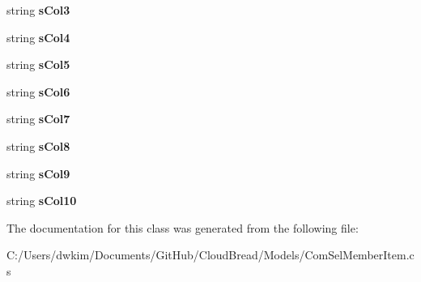 \begin{DoxyCompactItemize}
\item 
string {\bfseries s\+Col3}\hypertarget{a00064_ab3d514e486833de1826588673ecfb01e}{}\label{a00064_ab3d514e486833de1826588673ecfb01e}

\item 
string {\bfseries s\+Col4}\hypertarget{a00064_ae731adce03ce56bd5c048bfca7d3d70e}{}\label{a00064_ae731adce03ce56bd5c048bfca7d3d70e}

\item 
string {\bfseries s\+Col5}\hypertarget{a00064_ad1a7a097f6751bc4d8a6df72a99f0ab0}{}\label{a00064_ad1a7a097f6751bc4d8a6df72a99f0ab0}

\item 
string {\bfseries s\+Col6}\hypertarget{a00064_ac50fa37b948c925199e609fa81bdee90}{}\label{a00064_ac50fa37b948c925199e609fa81bdee90}

\item 
string {\bfseries s\+Col7}\hypertarget{a00064_a14004acfcaa0692ddf4cb9cb21b9afc1}{}\label{a00064_a14004acfcaa0692ddf4cb9cb21b9afc1}

\item 
string {\bfseries s\+Col8}\hypertarget{a00064_ae7f039cf81fe3a6a6389ed016ecc14ec}{}\label{a00064_ae7f039cf81fe3a6a6389ed016ecc14ec}

\item 
string {\bfseries s\+Col9}\hypertarget{a00064_a3b01666274081c14f5b675b7b9446b7a}{}\label{a00064_a3b01666274081c14f5b675b7b9446b7a}

\item 
string {\bfseries s\+Col10}\hypertarget{a00064_abea711a4ce996b79ca6b7c497e757afc}{}\label{a00064_abea711a4ce996b79ca6b7c497e757afc}

\end{DoxyCompactItemize}


The documentation for this class was generated from the following file\+:\begin{DoxyCompactItemize}
\item 
C\+:/\+Users/dwkim/\+Documents/\+Git\+Hub/\+Cloud\+Bread/\+Models/Com\+Sel\+Member\+Item.\+cs\end{DoxyCompactItemize}
